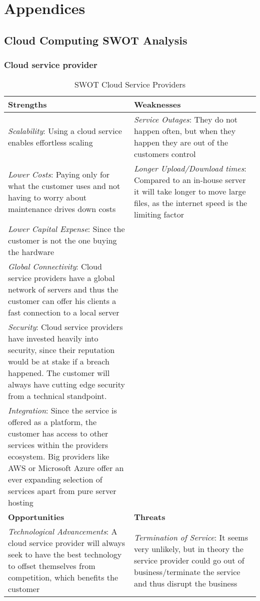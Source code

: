
\section{Appendices}
\subsection{Cloud Computing SWOT Analysis}
\label{app:swot}
\subsubsection{Cloud service provider}

\renewcommand{\arraystretch}{1.5}
\begin{table}
\caption{SWOT Cloud Service Providers}
\begin{center}
\begin{tabular}{ | p{0.5\linewidth} | p{0.5\linewidth} | } 
 \hline
 \textbf{Strengths} & \textbf{Weaknesses}\\ 
\hline
 \textit{Scalability}: Using a cloud service enables effortless scaling & \textit{Service Outages}: They do not happen often, but when they happen they are out of the customers control \\ 
\textit{Lower Costs}: Paying only for what the customer uses and not having to worry about maintenance drives down costs & \textit{Longer Upload/Download times}:  Compared to an in-house server it will take longer to move large files, as the internet speed is the limiting factor\\
\textit{Lower Capital Expense}: Since the customer is not the one buying the hardware & \\ 
 \textit{Global Connectivity}: Cloud service providers have a global network of servers and thus the customer can offer his clients a fast connection to a local server & \\
 \textit{Security}: Cloud service providers have invested heavily into security, since their reputation would be at stake if a breach happened. The customer will always have cutting edge security from a technical standpoint. & \\
 \textit{Integration}: Since the service is offered as a platform, the customer has access to other services within the providers ecosystem. Big providers like AWS or Microsoft Azure offer an ever expanding selection of services apart from pure server hosting & \\
 \hline
 \textbf{Opportunities} & \textbf{Threats}  \\ 
 \hline
\textit{Technological Advancements}: A cloud service provider will always seek to have the best technology to offset themselves from competition, which benefits the customer & \textit{Termination of Service}: It seems very unlikely, but in theory the service provider could go out of business/terminate the service and thus disrupt the business \\
\hline 
\end{tabular}
\end{center}
\end{table}

